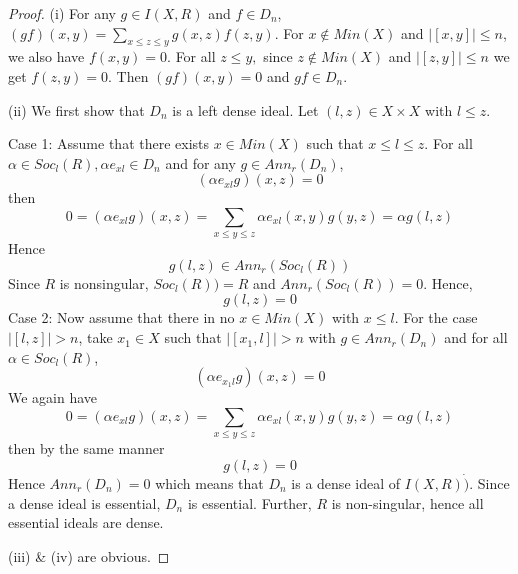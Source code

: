 \documentclass[12pt]{article}
\begin{document}
\begin{proof}
	(i) For any $g\in I(X,R)$ and $f\in D_{n}$, $(gf)(x,y)=\underset{x\leq z\leq
		y}{\sum }g(x,z)f(z,y).$ For $x\notin Min(X)$ and $\left\vert \left[ x,y%
	\right] \right\vert \leq n$, we also have $f(x,y)=0.$ For all $z\leq y,$
	since $z\notin Min(X)$ and $\left\vert \left[ z,y\right] \right\vert \leq n$
	we get $f(z,y)=0.$ Then $(gf)(x,y)=0$ and $gf\in D_{n}$.
	
	(ii) We first show that $D_{n}$ is a left dense ideal. Let $(l,z)\in
	X\times X$ with $l\leq z.$
	
	Case 1: Assume that there exists $x\in Min(X)$ such that $x\leq l\leq z.$ For all $\alpha \in Soc_{l}(R), \alpha e_{xl} \in D_{n}$ and for any 
	$g\in Ann_{r}(D_{n})$, 
	\begin{equation*}
	(\alpha e_{xl}g)(x,z)=0 
	\end{equation*}
	then
	\begin{equation*}
	0=(\alpha e_{xl}g)(x,z)=\underset{x\leq y\leq
		z}{\sum }\alpha e_{xl}(x,y)g(y,z)=\alpha g(l,z)
	\end{equation*}
	Hence
	\begin{equation*}
	g(l,z)\in Ann_{r}(Soc_{l}(R))
	\end{equation*}
	Since $R$ is nonsingular, $Soc_{l}(R))=R$ and $Ann_{r}(Soc_{l}(R))=0$. Hence,
	\begin{equation*}
	g(l,z)=0
	\end{equation*}
	Case  2: Now assume that there in no $x\in Min(X)$ with $x\leq l$. For the case $\left\vert \left[ l,z\right]
	\right\vert >n$, take $x_{1}\in X$ such that $\left\vert \left[ x_{1},l %
	\right] \right\vert >n$ with $g\in Ann_{r}(D_{n})$ and for all $\alpha
	\in Soc_{l}(R)$, 
	\begin{equation*}
	(\alpha e_{x_{1}l}g)(x,z)=0
	\end{equation*}
	We again have
	\begin{equation*}
	0=(\alpha e_{xl}g)(x,z)=\underset{x\leq y\leq
		z}{\sum }\alpha e_{xl}(x,y)g(y,z)=\alpha g(l,z)
	\end{equation*}
	then by the same manner
	\begin{equation*}
	g(l,z)=0
	\end{equation*}
	Hence $Ann_{r}(D_{n})=0$ which means that $D_{n}$
	is a dense ideal of $I(X,R)\dot{)}$. Since a dense ideal is essential, $%
	D_{n} $ is essential. Further, $R$ is non-singular, hence all essential
	ideals are dense.
	
	(iii) \& (iv) are obvious.
\end{proof}
\end{document}
